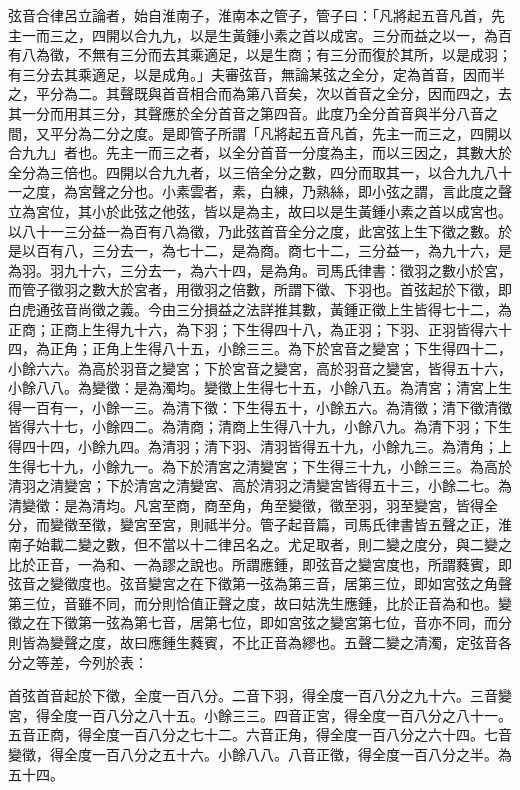 \begin{pinyinscope}
弦音合律呂立論者，始自淮南子，淮南本之管子，管子曰：「凡將起五音凡首，先主一而三之，四開以合九九，以是生黃鍾小素之首以成宮。三分而益之以一，為百有八為徵，不無有三分而去其乘適足，以是生商；有三分而復於其所，以是成羽；有三分去其乘適足，以是成角。」夫審弦音，無論某弦之全分，定為首音，因而半之，平分為二。其聲既與首音相合而為第八音矣，次以首音之全分，因而四之，去其一分而用其三分，其聲應於全分首音之第四音。此度乃全分首音與半分八音之間，又平分為二分之度。是即管子所謂「凡將起五音凡首，先主一而三之，四開以合九九」者也。先主一而三之者，以全分首音一分度為主，而以三因之，其數大於全分為三倍也。四開以合九九者，以三倍全分之數，四分而取其一，以合九九八十一之度，為宮聲之分也。小素雲者，素，白練，乃熟絲，即小弦之謂，言此度之聲立為宮位，其小於此弦之他弦，皆以是為主，故曰以是生黃鍾小素之首以成宮也。以八十一三分益一為百有八為徵，乃此弦首音全分之度，此宮弦上生下徵之數。於是以百有八，三分去一，為七十二，是為商。商七十二，三分益一，為九十六，是為羽。羽九十六，三分去一，為六十四，是為角。司馬氏律書：徵羽之數小於宮，而管子徵羽之數大於宮者，用徵羽之倍數，所謂下徵、下羽也。首弦起於下徵，即白虎通弦音尚徵之義。今由三分損益之法詳推其數，黃鍾正徵上生皆得七十二，為正商；正商上生得九十六，為下羽；下生得四十八，為正羽；下羽、正羽皆得六十四，為正角；正角上生得八十五，小餘三三。為下於宮音之變宮；下生得四十二，小餘六六。為高於羽音之變宮；下於宮音之變宮，高於羽音之變宮，皆得五十六，小餘八八。為變徵：是為濁均。變徵上生得七十五，小餘八五。為清宮；清宮上生得一百有一，小餘一三。為清下徵：下生得五十，小餘五六。為清徵；清下徵清徵皆得六十七，小餘四二。為清商；清商上生得八十九，小餘八九。為清下羽；下生得四十四，小餘九四。為清羽；清下羽、清羽皆得五十九，小餘九三。為清角；上生得七十九，小餘九一。為下於清宮之清變宮；下生得三十九，小餘三三。為高於清羽之清變宮；下於清宮之清變宮、高於清羽之清變宮皆得五十三，小餘二七。為清變徵：是為清均。凡宮至商，商至角，角至變徵，徵至羽，羽至變宮，皆得全分，而變徵至徵，變宮至宮，則祗半分。管子起音篇，司馬氏律書皆五聲之正，淮南子始載二變之數，但不當以十二律呂名之。尤足取者，則二變之度分，與二變之比於正音，一為和、一為謬之說也。所謂應鍾，即弦音之變宮度也，所謂蕤賓，即弦音之變徵度也。弦音變宮之在下徵第一弦為第三音，居第三位，即如宮弦之角聲第三位，音雖不同，而分則恰值正聲之度，故曰姑洗生應鍾，比於正音為和也。變徵之在下徵第一弦為第七音，居第七位，即如宮弦之變宮第七位，音亦不同，而分則皆為變聲之度，故曰應鍾生蕤賓，不比正音為繆也。五聲二變之清濁，定弦音各分之等差，今列於表：

首弦首音起於下徵，全度一百八分。二音下羽，得全度一百八分之九十六。三音變宮，得全度一百八分之八十五。小餘三三。四音正宮，得全度一百八分之八十一。五音正商，得全度一百八分之七十二。六音正角，得全度一百八分之六十四。七音變徵，得全度一百八分之五十六。小餘八八。八音正徵，得全度一百八分之半。為五十四。


\end{pinyinscope}
